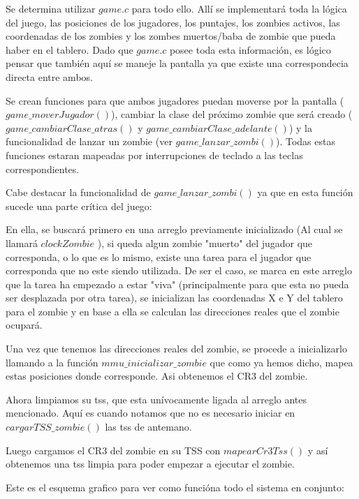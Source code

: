 \documentclass[a4paper]{article}
\begin{document}
Se determina utilizar $game.c$ para todo ello. Allí se implementará toda la lógica del juego, las posiciones de los jugadores, los puntajes, los zombies activos, las coordenadas de los zombies y los zombes muertos/baba de zombie que pueda haber en el tablero. Dado que $game.c$ posee toda esta información, es lógico pensar que también aquí se maneje la pantalla ya que existe una correspondecia directa entre ambos.

Se crean funciones para que ambos jugadores puedan moverse por la pantalla ($game\_ moverJugador()$), cambiar la clase del próximo zombie que será creado ($game\_ cambiarClase\_ atras()$ y $game\_ cambiarClase\_ adelante()$) y la funcionalidad de lanzar un zombie (ver $game\_ lanzar\_ zombi()$). Todas estas funciones estaran mapeadas por interrupciones de teclado a las teclas correspondientes.

Cabe destacar la funcionalidad de $game\_ lanzar\_ zombi()$ ya que en esta función sucede una parte crítica del juego:

En ella, se buscará primero en una arreglo previamente inicializado (Al cual se llamará $clockZombie$ ), si queda algun zombie "muerto" del jugador que corresponda, o lo que es lo mismo, existe una tarea para el jugador que corresponda que no este siendo utilizada. De ser el caso, se marca en este arreglo que la tarea ha empezado a estar "viva" (principalmente para que esta no pueda ser desplazada por otra tarea), se inicializan las coordenadas X e Y del tablero para el zombie y en base a ella se calculan las direcciones reales que el zombie ocupará.

Una vez que tenemos las direcciones reales del zombie, se procede a inicializarlo llamando a la función $mmu\_ inicializar\_ zombie$ que como ya hemos dicho, mapea estas posiciones donde corresponde. Asi obtenemos el CR3 del zombie.

Ahora limpiamos su tss, que esta unívocamente ligada al arreglo antes mencionado. Aquí es cuando notamos que no es necesario iniciar en $cargarTSS\_ zombie()$ las tss de antemano.

Luego cargamos el CR3 del zombie en su TSS con $mapearCr3Tss()$ y así obtenemos una tss limpia para poder empezar a ejecutar el zombie.

Este es el esquema grafico para ver como funcióna todo el sistema en conjunto:
\end{document}
